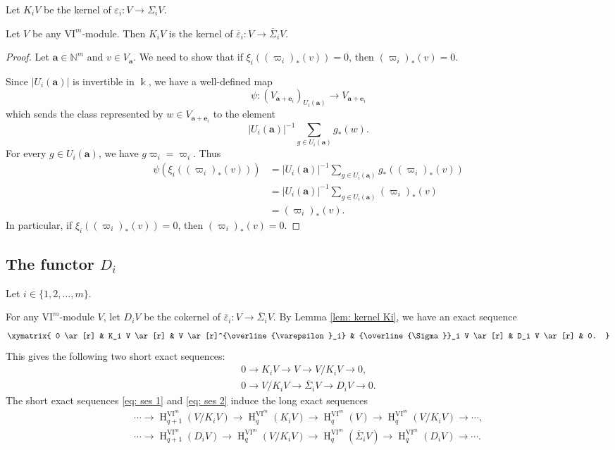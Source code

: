 \documentclass{amsart}
\numberwithin{equation}{section}
\DeclareMathOperator{\HH}{H}
\newcommand{\N}{{\mathbb{N}}}
\newcommand{\VI}{{\mathrm{VI}}}
\newcommand{\SSigma}{{\overline{\Sigma}}}
\begin{document}
Let $K_i V$ be the kernel of $\varepsilon_i: V\to \Sigma_i V$. 

\begin{lemma} \label{lem: kernel Ki}
   Let $V$ be any $\VI^m$-module. Then $K_i V$ is the kernel of $\overline\varepsilon_i: V\to \SSigma_i V$.
\end{lemma}

\begin{proof}
   Let $\mathbf{a}\in \N^m$ and $v\in V_{\mathbf{a}}$. We need to show that if $\xi_i((\varpi_i)_*(v))=0$, then $(\varpi_i)_*(v)=0$. 

   Since $|U_i(\mathbf{a})|$ is invertible in $\Bbbk$, we have a well-defined map 
   \[ \psi: (V_{\mathbf{a}+\mathbf{e}_i})_{U_i(\mathbf{a})} \to V_{\mathbf{a}+\mathbf{e}_i} \]
   which sends the class represented by $w\in V_{\mathbf{a}+\mathbf{e}_i}$ to the element 
   \[  |U_i(\mathbf{a})|^{-1}\sum_{g\in U_i(\mathbf{a})} g_*(w).  \]
   For every $g\in U_i(\mathbf{a})$, we have $g \varpi_i = \varpi_i$. Thus 
   \begin{align*}
      \psi(\xi_i((\varpi_i)_*(v))) &= |U_i(\mathbf{a})|^{-1}\sum_{g\in U_i(\mathbf{a})} g_*((\varpi_i)_*(v)) \\
      &= |U_i(\mathbf{a})|^{-1}\sum_{g\in U_i(\mathbf{a})} (\varpi_i)_*(v) \\ 
      &= (\varpi_i)_*(v).
   \end{align*}
   In particular, if $\xi_i((\varpi_i)_*(v))=0$, then $(\varpi_i)_*(v)=0$. 
\end{proof}




\subsection{The functor $D_i$}
Let $i\in \{1, 2, \ldots, m\}$. 

For any $\VI^m$-module $V$, let $D_i V$ be the cokernel of $\overline\varepsilon_i: V\to \overline\Sigma_i V$.
By Lemma \ref{lem: kernel Ki}, we have an exact sequence 
\[
   \xymatrix{
   0 \ar[r] & K_i V  \ar[r] & V \ar[r]^{\overline{\varepsilon}_i} & \SSigma_i V  \ar[r] & D_i V  \ar[r] & 0. } 
\]
This gives the following two short exact sequences:
\begin{gather}
   0 \longrightarrow K_i V \longrightarrow V \longrightarrow V/K_i V \longrightarrow 0,  \label{eq: ses 1} \\
   0 \longrightarrow V/K_i V \longrightarrow \SSigma_i V \longrightarrow D_i V \longrightarrow 0. \label{eq: ses 2}
\end{gather}
The short exact sequences \eqref{eq: ses 1} and \eqref{eq: ses 2} induce the long exact sequences
\begin{gather}
   \cdots \to \HH^{\VI^m}_{q+1} (V/K_i V) \to \HH^{\VI^m}_q(K_i V) \to \HH^{\VI^m}_q(V) \to \HH^{\VI^m}_q(V/K_i V) \to \cdots, \label{eq: les 1} \\
   \cdots \to \HH^{\VI^m}_{q+1} (D_i V) \to \HH^{\VI^m}_q(V/K_i V) \to \HH^{\VI^m}_q(\SSigma_i V) \to \HH^{\VI^m}_q(D_i V) \to \cdots. \label{eq: les 2}
\end{gather}
\end{document}
